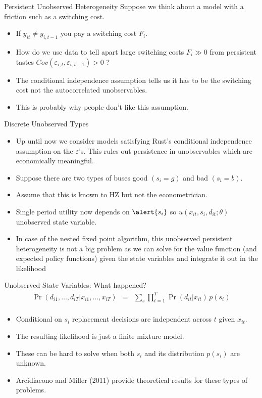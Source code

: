 \begin{frame}{Persistent Unobserved Heterogeneity}
Suppose we think about a model with a friction such as a switching cost.
\begin{itemize}
\item If $y_{it} \neq y_{i,t-1}$ you pay a switching cost $F_i$.
\item How do we use data to tell apart large switching costs $F_i  \gg0$ from persistent tastes $Cov(\varepsilon_{i,t},\varepsilon_{i,t-1}) > 0$ ?
\item The \alert{conditional independence assumption} tells us it has to be the switching cost not the autocorrelated unobservables.
\item This is probably why people don't like this assumption.
\end{itemize}
\end{frame}


\begin{frame}{Discrete Unobserved Types}
\begin{itemize}
\item Up until now we consider models satisfying Rust's \alert{conditional independence} assumption on the $\varepsilon$'s. This rules out persistence in unobservables which are economically meaningful.
\item Suppose there are two types of buses good $(s_i=g)$ and bad $(s_i=b)$.
\item Assume that this is known to HZ but not the econometrician.
\item Single period utility now depends on $\alert{s_i}$ so $u(x_{it},s_i,d_{it}; \theta)$ \alert{unobserved state variable}.
\item In case of the nested fixed point algorithm, this unobserved persistent heterogeneity is not a big problem as we can solve for the value function (and expected policy functions) given the state variables and \alert{integrate it out} in the likelihood
\end{itemize}
\end{frame}



\begin{frame}{Unobserved State Variables: What happened?}
\begin{align*}
\Pr(d_{i1},\ldots,d_{iT} | x_{i1},\ldots,x_{iT} ) &=& \sum_{s}  \prod_{t=1}^T \Pr(d_{it} | x_{it} ) \, p(s_i) \\
\end{align*}
\begin{itemize}
\item \alert{Conditional on $s_i$ replacement decisions are independent across $t$ given $x_{it}$}.
\item The resulting likelihood is just a \alert{finite mixture model}.
\item These can be hard to solve when both $s_i$ and its distribution $p(s_i)$ are unknown.
\item Arcidiacono and Miller (2011) provide theoretical results for these types of problems.
\end{itemize}
\end{frame}


